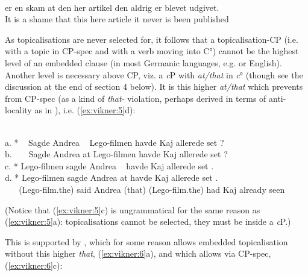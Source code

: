 \documentclass[output=paper]{LSP/langsci}
\begin{document}
\ea%
    \label{ex:vikner:4}
    \\
      { er }  { en }  { skam }  { at }  { den her   artikel }  { den }  { aldrig }  { er }  { blevet }  { udgivet.}\\
	 { {It} }  { {is} }  { {a} }  { {shame} }  { {that} }  { {this here article} }  { {it} }  { {never} }  { {is} }  { {been} }  { {published}}\\ 
    \z

	  

As topicalisations are never selected for, it follows that a topicalisation-CP (i.e. with a topic in CP-spec and with a verb moving into C°) cannot be the highest level of an embedded clause (in most Germanic languages, e.g.  or English). Another level is necessary above CP, viz. a \textit{c}P with \textit{at/that} in \textit{c}° (though see the discussion at the end of section 4 below). It is this higher \textit{at/that} which prevents  from CP-spec (as a kind of \textit{that-} violation, perhaps derived in terms of anti-locality as in \citealt{Douglas2015concordia}), i.e. (\ref{ex:vikner:5}d):

  \largerpage 
  
\ea%
\let\eachwordone=\small 
\let\eachwordtwo=\small
\small
    \label{ex:vikner:5}
\\
    \glllll  a. * ~ Sagde Andrea ~  Lego-filmen havde Kaj allerede set {\longrule}?\\
 b. ~ ~           Sagde Andrea at Lego-filmen havde Kaj allerede set {\longrule}?\\
 c. * Lego-filmen sagde Andrea ~  {\underline{}} havde Kaj allerede set {\longrule}.\\
 d. * Lego-filmen sagde Andrea at {\underline{}} havde Kaj allerede set {\longrule}.\\
 ~ ~  (Lego-film.the) said Andrea (that) (Lego-film.the) had Kaj already seen\\ 
\z  
    
   
(Notice that (\ref{ex:vikner:5}c) is ungrammatical for the same reason as (\ref{ex:vikner:5}a): topicalisations cannot be selected, they must be inside a \textit{c}P.)

This is supported by , which for some reason allows embedded topicalisation without this higher \textit{that}, (\ref{ex:vikner:6}a), and which allows  via CP-spec, (\ref{ex:vikner:6}c):
\end{document}
